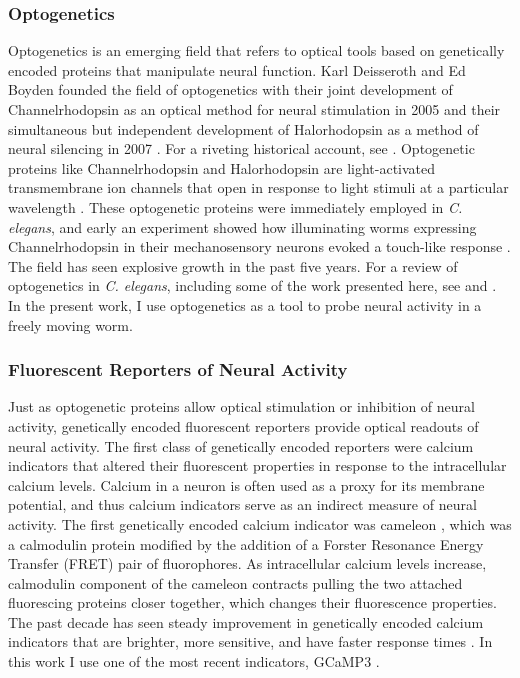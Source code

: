 \subsubsection{Optogenetics}
Optogenetics is an emerging field that refers to optical tools based on genetically encoded proteins that manipulate neural function. Karl Deisseroth and Ed Boyden founded the field of optogenetics with their joint development of Channelrhodopsin as an optical method for neural stimulation in  2005 \citep{boyden_millisecond-timescale_2005} and their simultaneous but independent development of Halorhodopsin as a method of neural silencing in 2007 \citep{zhang_multimodal_2007, han_multiple-color_2007}.  For a riveting historical account, see \citep{boyden_history_2011}. Optogenetic proteins like Channelrhodopsin and Halorhodopsin are light-activated transmembrane ion channels that open in response to light stimuli at a particular wavelength \citep{nagel_channelrhodopsin-2_2003, yizhar_optogenetics_2011, fenno_development_2011}. These optogenetic proteins were immediately employed  in \textit{C. elegans}, and early an experiment showed how illuminating worms expressing Channelrhodopsin in their mechanosensory neurons evoked a touch-like response  \citep{nagel_light_2005}.  The field has seen explosive growth in the past five years. For a review of optogenetics in \textit{C. elegans}, including some of the work presented here, see \citep{xu_early_2011} and \citep{yizhar_optogenetics_2011}. In the present work, I use optogenetics as a tool to probe neural activity in a freely moving worm. 

\subsubsection{Fluorescent Reporters of Neural Activity}
Just as optogenetic proteins allow optical stimulation or inhibition of neural activity,  genetically encoded fluorescent reporters provide optical readouts of neural activity.  The first class of genetically encoded reporters were calcium indicators that altered their fluorescent properties in response to the intracellular calcium levels. Calcium in a neuron is often used as a proxy for its membrane potential, and thus calcium indicators serve as an indirect measure of neural activity.   The first genetically encoded calcium indicator was cameleon \citep{miyawaki_fluorescent_1997}, which was a calmodulin protein modified by the addition of a Forster Resonance Energy Transfer (FRET) pair of fluorophores. As intracellular calcium levels increase, calmodulin component of the cameleon contracts pulling the two attached fluorescing proteins closer together, which changes their fluorescence properties. The past decade has seen  steady improvement in genetically encoded calcium indicators that are brighter, more sensitive, and have faster response times \citep{miyawaki_innovations_2005,mank_genetically_2008,yamada_quantitative_2011}. In this work I use one of the most recent indicators, GCaMP3 \citep{tian_imaging_2009}.
 
